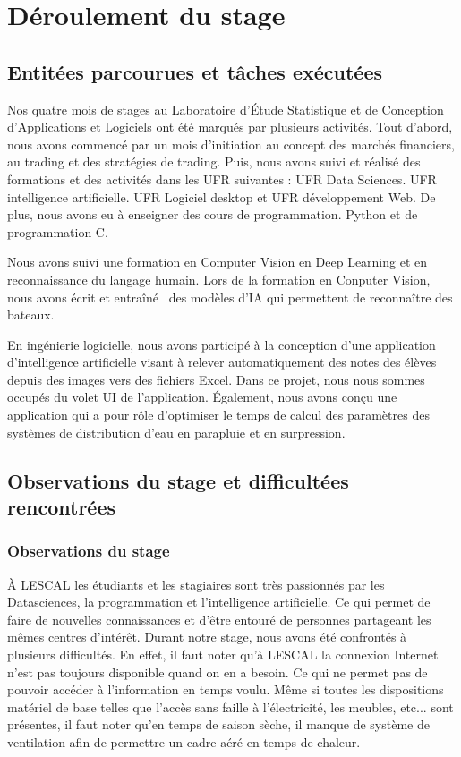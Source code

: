 \section{Déroulement du stage}

\subsection{Entitées parcourues et tâches exécutées}
\par{Nos quatre mois de stages au Laboratoire d'Étude Statistique et 
de Conception d'Applications et Logiciels ont été marqués par plusieurs
activités. Tout d'abord, nous avons commencé par un mois d'initiation 
au concept des marchés financiers, au trading et des stratégies de trading.
Puis, nous avons suivi et réalisé des formations et des activités dans
les UFR suivantes : UFR Data Sciences. UFR intelligence artificielle.
UFR Logiciel desktop et UFR développement Web. De plus, nous avons eu 
à enseigner des cours de programmation.
Python et de programmation C.}

\par{Nous avons suivi une formation en Computer Vision en Deep Learning
et en reconnaissance du langage humain.
Lors de la formation en Conputer Vision, nous avons écrit et entraîné 
des modèles d'IA qui permettent de reconnaître des bateaux.}

\par{
    En ingénierie logicielle, nous avons participé à la conception 
    d'une application d'intelligence artificielle visant à relever 
    automatiquement des notes des élèves depuis des images vers des 
    fichiers Excel. Dans ce projet, nous nous sommes occupés du volet 
    UI de l'application.
    Également, nous avons conçu une application qui a pour rôle 
    d'optimiser le temps de calcul des paramètres des systèmes de 
    distribution d'eau en parapluie et en surpression.
}
    

\subsection{Observations du stage et difficultées rencontrées}

\subsubsection{Observations du stage}
\par{
    À LESCAL les étudiants et les stagiaires sont très passionnés 
    par les Datasciences, la programmation et l'intelligence 
    artificielle. Ce qui permet de faire de nouvelles connaissances 
    et d'être entouré de personnes partageant les mêmes centres 
    d'intérêt. Durant notre stage, nous avons été confrontés à 
    plusieurs difficultés. En effet, il faut noter qu'à LESCAL la 
    connexion Internet n'est pas toujours disponible quand on en a 
    besoin. Ce qui ne permet pas de pouvoir accéder à l'information 
    en temps voulu. Même si toutes les dispositions matériel de base 
    telles que l'accès sans faille à l'électricité, les meubles, 
    etc... sont présentes, il faut noter qu'en temps de saison sèche, 
    il manque de système de ventilation afin de permettre un cadre 
    aéré en temps de chaleur. 
}


